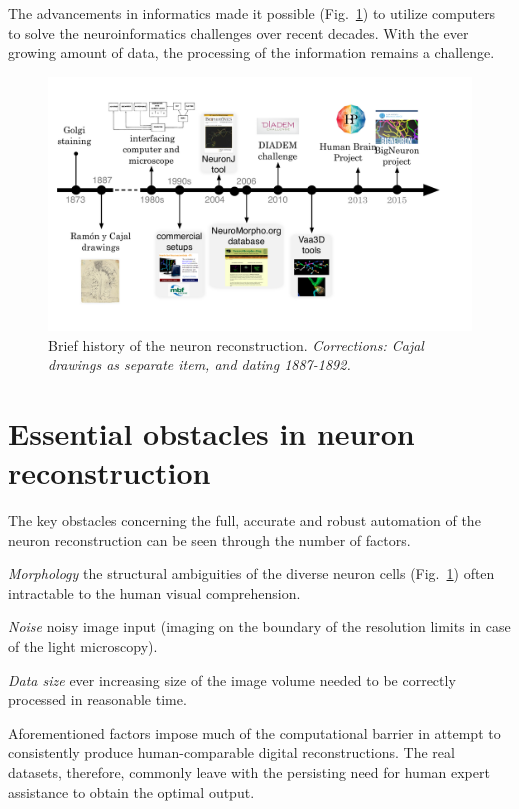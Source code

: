 The advancements in informatics made it possible (Fig.~\ref{ch1__fig1}) to utilize computers to solve the neuroinformatics challenges over recent decades. With the ever growing amount of data, the processing of the information remains a challenge.   

\begin{figure}
	\begin{center}
		\includegraphics[width=\textwidth]{ch1_fig1}
	\end{center}
	\vspace{-3ex}
	\caption{Brief history of the neuron reconstruction. \textit{Corrections: Cajal drawings as separate item, and dating 1887-1892.}}
	\vspace{-1ex}
	\label{ch1__fig1}
\end{figure}

\section{Essential obstacles in neuron reconstruction}
The key obstacles concerning the full, accurate and robust automation of the neuron reconstruction \cite{meijering2010neuron,donohue2011automated,acciai2016automated} can be seen through the number of factors.

\textit{Morphology} the structural ambiguities of the diverse neuron cells (Fig.~\ref{}) often intractable to the human visual comprehension.

\textit{Noise} noisy image input (imaging on the boundary of the resolution limits in case of the light microscopy).

\textit{Data size} ever increasing size of the image volume needed to be correctly processed in reasonable time.

Aforementioned factors impose much of the computational barrier \cite{peng2011proof,svoboda2011past} in attempt to consistently produce human-comparable digital reconstructions. The real datasets, therefore, commonly leave with the persisting need for human expert assistance to obtain the optimal output. 

